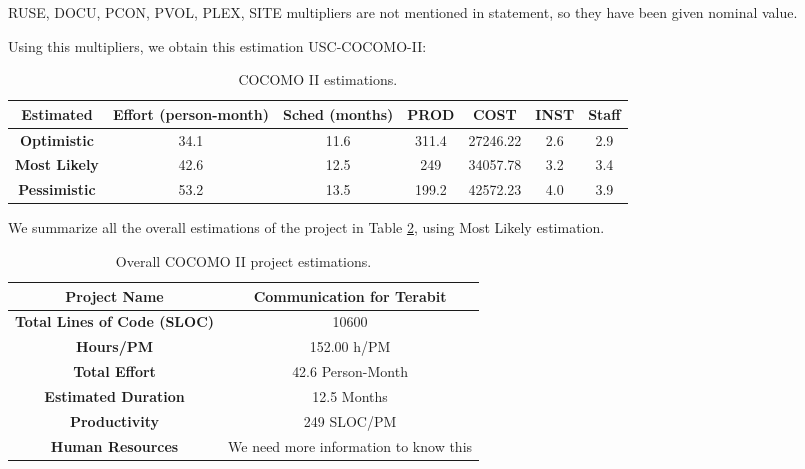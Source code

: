 RUSE, DOCU, PCON, PVOL, PLEX, SITE multipliers are not mentioned in statement, so they have been given nominal value.


Using this multipliers, we obtain this estimation USC-COCOMO-II:

\begin{table}[hbtp]
\begin{tabular}{|c||c|c|c|c|c|c|}
\hline
\textbf{Estimated} & \textbf{Effort (person-month)} & \textbf{Sched (months)} & \textbf{PROD} & \textbf{COST} & \textbf{INST} & \textbf{Staff} \\ \hline
\textbf{Optimistic} & 34.1 & 11.6 & 311.4 & 27246.22 & 2.6 & 2.9 \\
\textbf{Most Likely} & 42.6& 12.5 & 249 & 34057.78 & 3.2 & 3.4 \\
\textbf{Pessimistic} & 53.2 & 13.5 &199.2 & 42572.23 & 4.0 & 3.9\\ \hline
\end{tabular}
\label{tbl_Problem2}
\caption{COCOMO II estimations.}
\end{table}

We summarize all the overall estimations of the project in Table \ref{tbl_Problem1_ALL}, using Most Likely estimation.

\begin{table}[hbtp]
\begin{tabular}{|c|c|} \hline
\textbf{Project Name} & {Communication for Terabit} \\ \hline
\textbf{Total Lines of Code (SLOC)} & {10600} \\ \hline
\textbf{Hours/PM} & {152.00 h/PM} \\ \hline
\textbf{Total Effort} & {42.6 Person-Month} \\ \hline
\textbf{Estimated Duration} & {12.5 Months} \\ \hline
\textbf{Productivity} & {249 SLOC/PM} \\ \hline
\textbf{Human Resources} & We need more information to know this \\ \hline
\end{tabular}
\label{tbl_Problem1_ALL}
\caption{Overall COCOMO II project estimations.}
\end{table}
